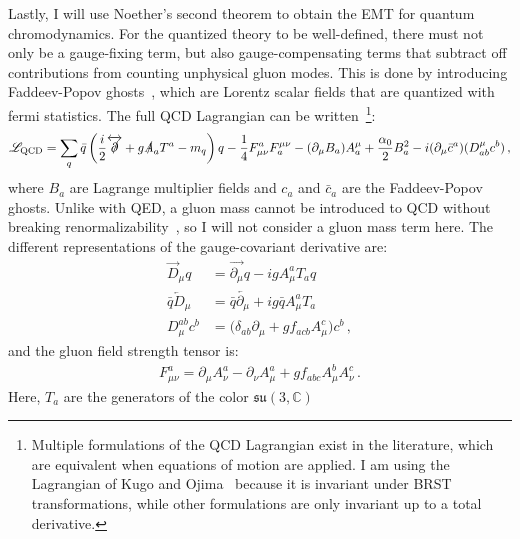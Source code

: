 \documentclass[prd,preprint,
  showpacs,showkeys,lengthcheck,
  nofootinbib,tightenlines,onecolumn,notitlepage,
  preprintnumbers,superscriptaddress]{revtex4-1}
\newcommand{\Lag}{\ensuremath{\mathscr{L}}}
\begin{document}
Lastly, I will use Noether's second theorem
to obtain the EMT for quantum chromodynamics.
For the quantized theory to be well-defined,
there must not only be a gauge-fixing term,
but also gauge-compensating terms that subtract off
contributions from counting unphysical gluon modes.
This is done by introducing Faddeev-Popov ghosts~\cite{Faddeev:1967fc},
which are Lorentz scalar fields that are quantized with fermi statistics.
The full QCD Lagrangian can be
written~\cite{Becchi:1974md,Becchi:1975nq,Tyutin:1975qk,Kugo:1979gm}\footnote{
  Multiple formulations of the QCD Lagrangian exist in the literature,
  which are equivalent when equations of motion are applied.
  I am using the Lagrangian of Kugo and Ojima~\cite{Kugo:1979gm}
  because it is invariant under BRST transformations,
  while other formulations are only invariant up to a total derivative.
}:
\begin{align}
  \label{eqn:lagrangian:QCD}
  \Lag_{\mathrm{QCD}}
  =
  \sum_q
  \bar{q}
  \left(
  \frac{i}{2}
  \overleftrightarrow{\slashed{\partial}}
  +
  g\slashed{A}_a T^a
  -
  m_q
  \right)
  q
  -
  \frac{1}{4} F^a_{\mu\nu} F_a^{\mu\nu}
  - (\partial_\mu B_a) A^\mu_a
  +
  \frac{\alpha_0}{2} B_a^2
  -
  i (\partial_\mu \bar{c}^a) (D^\mu_{ab} c^b)
  \,,
\end{align}
where $B_a$ are Lagrange multiplier fields and $c_a$ and $\bar{c}_a$
are the Faddeev-Popov ghosts.
Unlike with QED, a gluon mass cannot be introduced to QCD
without breaking renormalizability~\cite{Salam:1962aq,Boulware:1970zc},
so I will not consider a gluon mass term here.
The different representations of the gauge-covariant derivative are:
\begin{subequations}
  \begin{align}
    \overrightarrow{D}_\mu q
    &=
    \overrightarrow{\partial_\mu} q
    -
    ig A^a_\mu T_a q
    \\
    \bar{q} \overleftarrow{D}_\mu
    &=
    \bar{q} \overleftarrow{\partial_\mu}
    +
    ig \bar{q} A^a_\mu T_a
    \\
    D_\mu^{ab} c^b
    &=
    \Big(
    \delta_{ab} \partial_\mu
    + g f_{acb} A_\mu^c
    \Big)
    c^b
    \,,
  \end{align}
\end{subequations}
and the gluon field strength tensor is:
\begin{align}
  F_{\mu\nu}^a
  =
  \partial_\mu
  A_\nu^a
  -
  \partial_\nu
  A_\mu^a
  +
  g f_{abc} A_\mu^b A_\nu^c
  \,.
\end{align}
Here, $T_a$ are the generators of the color $\mathfrak{su}(3,\mathbb{C})$
\end{document}
